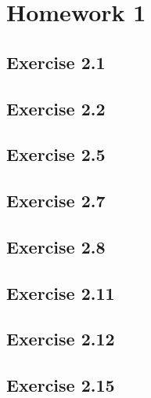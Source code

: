 \section{Homework 1}

\subsection{Exercise 2.1}

\subsection{Exercise 2.2}

\subsection{Exercise 2.5}

\subsection{Exercise 2.7}

\subsection{Exercise 2.8}

\subsection{Exercise 2.11}

\subsection{Exercise 2.12}

\subsection{Exercise 2.15}

